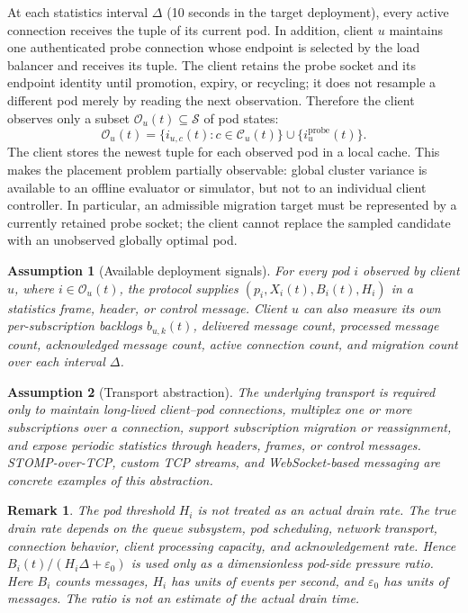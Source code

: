 \documentclass[manuscript,nonacm]{acmart}
\newtheorem{assumption}{Assumption}
\newtheorem{remark}{Remark}
\begin{document}
At each statistics interval $\Delta$ (10 seconds in the target deployment),
every active connection receives the tuple of its current pod. In addition,
client $u$ maintains one authenticated probe connection whose endpoint is
selected by the load balancer and receives its tuple. The client
retains the probe socket and its endpoint identity until promotion, expiry, or
recycling; it does not resample a different pod merely by reading the next
observation. Therefore the client observes only a subset
$\mathcal{O}_u(t)\subseteq\mathcal{S}$ of pod states:
\begin{equation}
	\mathcal{O}_u(t)=
	\{i_{u,c}(t):c\in\mathcal{C}_u(t)\}
	\cup
	\{i^{\mathrm{probe}}_u(t)\}.
\end{equation}
The client stores the newest tuple for each observed pod in a local cache. This
makes the placement problem partially observable: global cluster variance is
available to an offline evaluator or simulator, but not to an individual client
controller. In particular, an admissible migration target must be represented
by a currently retained probe socket; the client cannot replace the sampled
candidate with an unobserved globally optimal pod.

\begin{assumption}[Available deployment signals]
For every pod $i$ observed by client $u$, where $i\in\mathcal{O}_u(t)$, the
protocol supplies $(p_i,X_i(t),B_i(t),H_i)$ in a statistics frame, header, or
control message. Client
$u$ can also measure its own per-subscription backlogs $b_{u,k}(t)$, delivered
message count, processed message count, acknowledged message count, active
connection count, and migration count over each interval $\Delta$.
\end{assumption}

\begin{assumption}[Transport abstraction]
The underlying transport is required only to maintain long-lived client--pod
connections, multiplex one or more subscriptions over a connection, support
subscription migration or reassignment, and expose periodic statistics through
headers, frames, or control messages. STOMP-over-TCP, custom TCP streams, and
WebSocket-based messaging are concrete examples of this abstraction.
\end{assumption}

\begin{remark}
The pod threshold $H_i$ is not treated as an actual drain rate. The true drain
rate depends on the queue subsystem, pod scheduling, network transport,
connection behavior, client processing capacity, and acknowledgement rate.
Hence $B_i(t)/(H_i\Delta+\varepsilon_0)$ is used only as a dimensionless
pod-side pressure ratio. Here $B_i$ counts messages, $H_i$ has units of
events per second, and $\varepsilon_0$ has units of messages. The ratio is
not an estimate of the actual drain time.
\end{remark}
\end{document}
